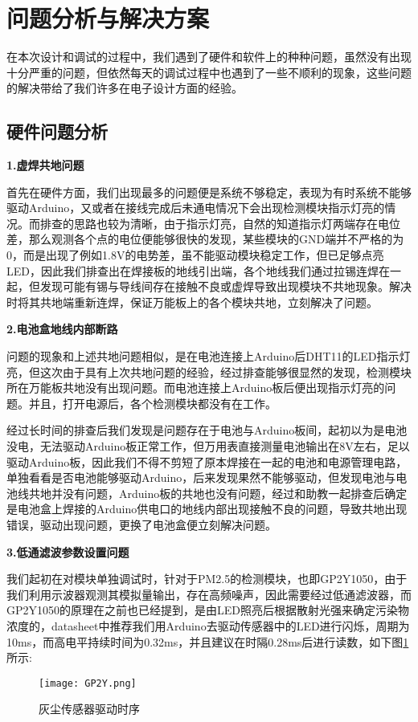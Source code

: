 \section{问题分析与解决方案}

\par{} 在本次设计和调试的过程中，我们遇到了硬件和软件上的种种问题，虽然没有出现十分严重的问题，但依然每天的调试过程中也遇到了一些不顺利的现象，这些问题的解决带给了我们许多在电子设计方面的经验。



\subsection{硬件问题分析}

\par{} \textbf{1.虚焊共地问题}
\par{}首先在硬件方面，我们出现最多的问题便是系统不够稳定，表现为有时系统不能够驱动Arduino，又或者在接线完成后未通电情况下会出现检测模块指示灯亮的情况。而排查的思路也较为清晰，由于指示灯亮，自然的知道指示灯两端存在电位差，那么观测各个点的电位便能够很快的发现，某些模块的GND端并不严格的为0，而是出现了例如1.8V的电势差，虽不能驱动模块稳定工作，但已足够点亮LED，因此我们排查出在焊接板的地线引出端，各个地线我们通过拉锡连焊在一起，但发现可能有锡与导线间存在接触不良或虚焊导致出现模块不共地现象。解决时将其共地端重新连焊，保证万能板上的各个模块共地，立刻解决了问题。

\par{} \textbf{2.电池盒地线内部断路}

\par{} 问题的现象和上述共地问题相似，是在电池连接上Arduino后DHT11的LED指示灯亮，但这次由于具有上次共地问题的经验，经过排查能够很显然的发现，检测模块所在万能板共地没有出现问题。而电池连接上Arduino板后便出现指示灯亮的问题。并且，打开电源后，各个检测模块都没有在工作。
\par{}经过长时间的排查后我们发现是问题存在于电池与Arduino板间，起初以为是电池没电，无法驱动Arduino板正常工作，但万用表直接测量电池输出在8V左右，足以驱动Arduino板，因此我们不得不剪短了原本焊接在一起的电池和电源管理电路，单独看看是否电池能够驱动Arduino，后来发现果然不能够驱动，但发现电池与电池线共地并没有问题，Arduino板的共地也没有问题，经过和助教一起排查后确定是电池盒上焊接的Arduino供电口的地线内部出现接触不良的问题，导致共地出现错误，驱动出现问题，更换了电池盒便立刻解决问题。

\par{} \textbf{3.低通滤波参数设置问题}

\par{} 我们起初在对模块单独调试时，针对于PM2.5的检测模块，也即GP2Y1050，由于我们利用示波器观测其模拟量输出，存在高频噪声，因此需要经过低通滤波器，而GP2Y1050的原理在之前也已经提到，是由LED照亮后根据散射光强来确定污染物浓度的，datasheet中推荐我们用Arduino去驱动传感器中的LED进行闪烁，周期为10ms，而高电平持续时间为0.32ms，并且建议在时隔0.28ms后进行读数，如下图\ref{imgn}所示:
\begin{figure}[H]
  \centering
  \texttt{[image: GP2Y.png]}
  \caption{灰尘传感器驱动时序}
  \label{imgn}
\end{figure}

